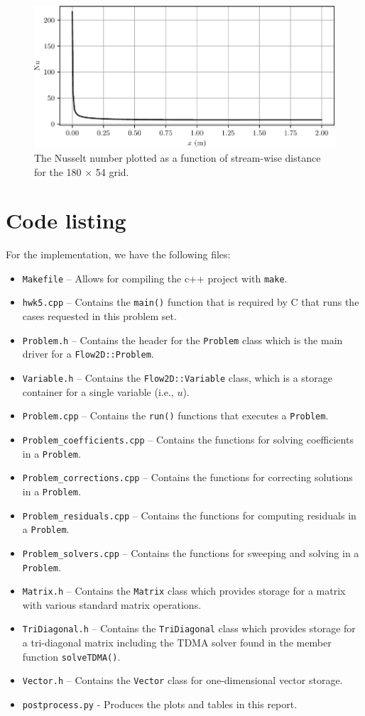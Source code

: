 \documentclass{article}
\begin{document}
\begin{figure}[H]
	\centering
	\includegraphics[width=0.75\linewidth]{../results/Nu}
	\caption{The Nusselt number plotted as a function of stream-wise distance for the 180 $\times$ 54 grid.}
	\label{fig:Nu}
\end{figure}

\section*{Code listing}

For the implementation, we have the following files:
\begin{itemize}
	\item \texttt{Makefile} -- Allows for compiling the c++ project with \texttt{make}.
	\item \texttt{hwk5.cpp} -- Contains the \texttt{main()} function that is required by C that runs the cases requested in this problem set.
	\item \texttt{Problem.h} -- Contains the header for the \texttt{Problem} class which is the main driver for a \texttt{Flow2D::Problem}.
	\item \texttt{Variable.h} -- Contains the \texttt{Flow2D::Variable} class, which is a storage container for a single variable (i.e., $u$).
	\item \texttt{Problem.cpp} -- Contains the \texttt{run()} functions that executes a \texttt{Problem}.
	\item \texttt{Problem\_coefficients.cpp} -- Contains the functions for solving coefficients in a \texttt{Problem}.
	\item \texttt{Problem\_corrections.cpp} -- Contains the functions for correcting solutions in a \texttt{Problem}.
	\item \texttt{Problem\_residuals.cpp} -- Contains the functions for computing residuals in a \texttt{Problem}.
	\item \texttt{Problem\_solvers.cpp} -- Contains the functions for sweeping and solving in a \texttt{Problem}.
	\item \texttt{Matrix.h} -- Contains the \texttt{Matrix} class which provides storage for a matrix with various standard matrix operations.
	\item \texttt{TriDiagonal.h} -- Contains the \texttt{TriDiagonal} class which provides storage for a tri-diagonal matrix including the TDMA solver found in the member function \texttt{solveTDMA()}.
	\item \texttt{Vector.h} -- Contains the \texttt{Vector} class for one-dimensional vector storage.
	\item \texttt{postprocess.py} - Produces the plots and tables in this report.
\end{itemize}
\end{document}
